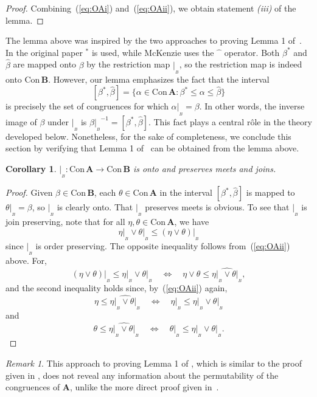 \documentclass[cm,dissertation,actual,final]{uhthesis}
\theoremstyle{plain}
\newtheorem{corollary}[theorem]{Corollary}
\theoremstyle{definition}
\theoremstyle{remark}
\newtheorem*{remark}{Remark}
\numberwithin{theorem}{section}
\numberwithin{claim}{chapter}
\numberwithin{equation}{section}
\numberwithin{conjecture}{chapter}
\newcommand{\<}{\ensuremath{\langle}}
\renewcommand{\>}{\ensuremath{\rangle}}
\renewcommand{\leq}{\ensuremath{\leqslant}}
\newcommand{\join}{\ensuremath{\vee}}
\newcommand{\Con}{\ensuremath{\mathrm{Con\,}}}
\newcommand{\0}{\ensuremath{\mathbf{0}}}
\newcommand{\1}{\ensuremath{\mathbf{1}}}
\newcommand{\2}{\ensuremath{\mathbf{2}}}
\newcommand{\3}{\ensuremath{\mathbf{3}}}
\newcommand{\4}{\ensuremath{\mathbf{4}}}
\newcommand{\5}{\ensuremath{\mathbf{5}}}
\newcommand{\bA}{\ensuremath{\mathbf{A}}}
\newcommand{\bB}{\ensuremath{\mathbf{B}}}
\newcommand{\resB}{\ensuremath{|_{_B}}}
\newcommand{\hatmap}{\ensuremath{\widehat{\phantom{x}}}}
\begin{document}
\begin{proof}
  Combining~(\ref{eq:OAi}) and~(\ref{eq:OAii}), we obtain statement {\it (iii)} of the lemma.
\end{proof}

The lemma above was inspired by the two approaches to proving Lemma 1
of~\cite{Palfy:1980}.  In the original paper $^*$ is used, while McKenzie uses
the $\hatmap$ operator.  Both $\beta^*$ and
$\widehat{\beta}$ are mapped onto $\beta$ by the restriction map $\resB$, so
the restriction map is indeed onto $\Con\bB$.
However, our lemma emphasizes the fact that the interval 
\[
  [\beta^*, \widehat{\beta}] = 
  \{
  \alpha \in \Con\bA : \beta^* \leq \alpha \leq \widehat{\beta}
  \}
\]
is precisely the set of congruences for
which $\alpha\resB = \beta$.  In other words, the
inverse image of $\beta$ under $\resB$ is
$\beta \resB^{-1} = [\beta^*, \widehat{\beta}]$.
This fact plays a central r\^{o}le in the
theory developed below.
Nonetheless, for the sake of completeness, we conclude this section by
verifying that Lemma 1 of~\cite{Palfy:1980} can be obtained from the lemma above.
\begin{corollary}
  $\resB : \Con\bA \rightarrow \Con\bB$ is onto and preserves meets and joins.
\end{corollary}
\begin{proof}
  Given $\beta\in \Con\bB$, each $\theta\in \Con\bA$ in the interval $[\beta^*,
    \widehat{\beta}]$ is mapped to $\theta\resB = \beta$, so $\resB$ is clearly
  onto.  That $\resB$ preserves meets is obvious.  To see that $\resB$ is
  join preserving, note that for all $\eta, \theta \in \Con\bA$, we have
  \[
  \eta\resB \join \theta\resB \leq (\eta \join \theta)\resB
  \]
  since $\resB$ is order preserving.  The opposite inequality follows
  from~(\ref{eq:OAii}) above. For,
  \[
  (\eta \join \theta)\resB \leq \eta\resB \join \theta\resB
  \quad \Leftrightarrow \quad 
  \eta \join \theta \leq \widehat{\eta\resB \join \theta\resB},
  \]
  and the second inequality holds since, by~(\ref{eq:OAii}) again,
  \[
  \eta \leq \widehat{\eta\resB \join \theta\resB}
  \quad \Leftrightarrow \quad 
  \eta\resB \leq \eta\resB \join \theta\resB
  \]
  and 
  \[
  \theta \leq \widehat{\eta\resB \join \theta\resB}
  \quad \Leftrightarrow \quad 
  \theta\resB \leq \eta\resB \join \theta\resB.
  \]
\end{proof}
\begin{remark}
  This approach to proving Lemma 1 of \cite{Palfy:1980}, which is similar to the
  proof given in \cite{McKenzie:1983}, does not reveal any information about
  the permutability of the congruences of $\bA$, unlike the more direct proof
  given in~\cite{Palfy:1980}. 
\end{remark}
\end{document}
